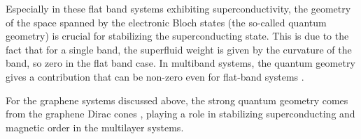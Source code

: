 \documentclass[../notes.tex]{subfiles}
\begin{document}
Especially in these flat band systems exhibiting superconductivity, the geometry of the space spanned by the electronic Bloch states (the so-called quantum geometry) is crucial for stabilizing the superconducting state.
This is due to the fact that for a single band, the superfluid weight is given by the curvature of the band, so zero in the flat band case.
In multiband systems, the quantum geometry gives a contribution that can be non-zero even for flat-band systems \cite{peottaSuperfluidityTopologicallyNontrivial2015}.

For the graphene systems discussed above, the strong quantum geometry comes from the graphene Dirac cones \cite{wehlingDiracMaterials2014}, playing a role in stabilizing superconducting \cite{peottaSuperfluidityTopologicallyNontrivial2015, liangBandGeometryBerry2017, tanakaSuperfluidStiffnessMagicangle2025} and magnetic order \cite{abouelkomsanQuantumMetricInduced2023, liuOrbitalMagneticStates2021} in the multilayer systems.
\end{document}
